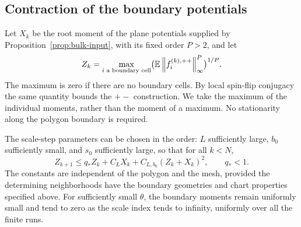 \subsection{Contraction of the boundary potentials}

Let $X_k$ be the root moment of the plane potentials supplied by
Proposition~\ref{prop:bulk-input}, with its fixed order $P>2$, and let
\begin{equation}\label{eq:polygon-boundary-moment}
 Z_k=\max_{i\text{ a boundary cell}}
       \bigl(\mathbb E\left\lVert f_i^{(k),++}\right\rVert_\infty^P\bigr)^{1/P}.
\end{equation}
The maximum is zero if there are no boundary cells.  By local spin-flip
conjugacy the same quantity bounds the $+-$ construction.  We take the
maximum of the individual moments, rather than the moment of a maximum.
No stationarity along the polygon boundary is required.

\begin{lemma}\label{lem:boundary-recursion}
The scale-step parameters can be chosen in the order: $L$ sufficiently
large, $b_0$ sufficiently small, and $s_0$ sufficiently large, so that
for all $k<N$,
\begin{equation}\label{eq:boundary-recurrence}
 Z_{k+1}\le q_* Z_k+C_LX_k
                    +C_{L,b_0}(Z_k+X_k)^2,
 \qquad q_*<1.
\end{equation}
The constants are independent of the polygon and the mesh, provided
the determining neighborhoods have the boundary geometries and chart
properties specified above.  For sufficiently small $\theta$, the
boundary moments remain uniformly small and tend to zero as the
scale index tends to infinity, uniformly over all the finite runs.
\end{lemma}

